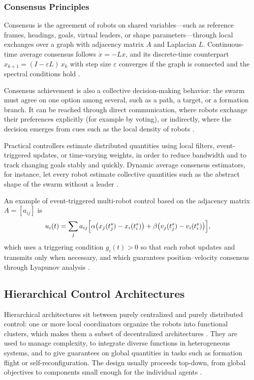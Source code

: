 \subsubsection{Consensus Principles}

Consensus is the agreement of robots on shared variables---such as reference
frames, headings, goals, virtual leaders, or shape parameters---through local
exchanges over a graph with adjacency matrix $A$ and Laplacian $L$.
Continuous-time average consensus follows $\dot{x} = -Lx$, and its discrete-time
counterpart $x_{k+1} = (I - \varepsilon L)\,x_k$ with step size $\varepsilon$
converges if the graph is connected and the spectral conditions hold \cite{hamann2018swarm}.

Consensus achievement is also a collective decision-making behavior: the swarm
must agree on one option among several, such as a path, a target, or a
formation branch. It can be reached through direct communication, where robots
exchange their preferences explicitly (for example by voting), or indirectly,
where the decision emerges from cues such as the local density of robots
\cite{brambilla2013swarm,hamann2018swarm}.

Practical controllers estimate distributed quantities using local filters,
event-triggered updates, or time-varying weights, in order to reduce bandwidth
and to track changing goals stably and quickly. Dynamic average consensus
estimators, for instance, let every robot estimate collective quantities such as
the abstract shape of the swarm without a leader \cite{gudeta2021leaderless}.

An example of event-triggered multi-robot control based on the adjacency matrix
$A = [a_{ij}]$ is
\begin{equation}
  u_i(t) = \sum_{j} a_{ij} \Bigl[\alpha\bigl(x_j(t_j^{s}) - x_i(t_i^{s})\bigr)
           + \beta\bigl(v_j(t_j^{s}) - v_i(t_i^{s})\bigr)\Bigr],
  \label{eq:event-triggered}
\end{equation}
which uses a triggering condition $g_i(t) > 0$ so that each robot updates and
transmits only when necessary, and which guarantees position--velocity consensus
through Lyapunov analysis \cite{pan2018signal}.

\subsection{Hierarchical Control Architectures}

Hierarchical architectures sit between purely centralized and purely
distributed control: one or more local coordinators organize the robots into
functional clusters, which makes them a subset of decentralized architectures
\cite{yan2013survey}. They are used to manage complexity, to integrate diverse
functions in heterogeneous systems, and to give guarantees on global quantities
in tasks such as formation flight or self-reconfiguration. The design usually
proceeds top-down, from global objectives to components small enough for the
individual agents \cite{brambilla2013swarm}.

